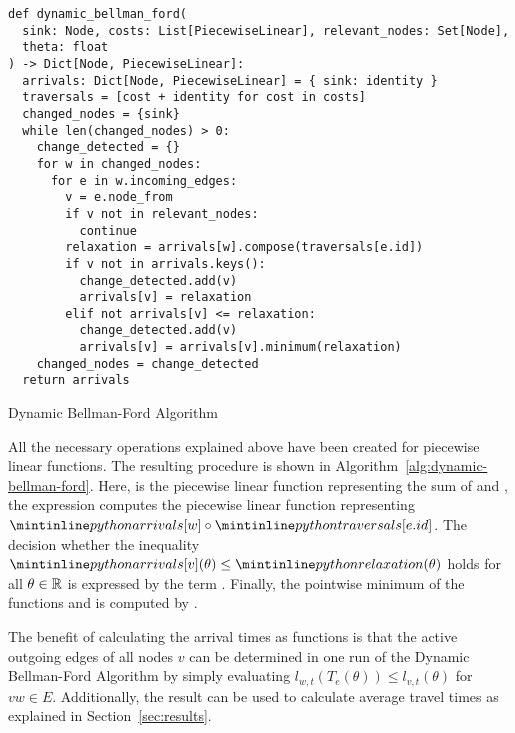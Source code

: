 \begin{algorithm}[ht]
    \begin{verbatim}
def dynamic_bellman_ford(
  sink: Node, costs: List[PiecewiseLinear], relevant_nodes: Set[Node],
  theta: float
) -> Dict[Node, PiecewiseLinear]:
  arrivals: Dict[Node, PiecewiseLinear] = { sink: identity }
  traversals = [cost + identity for cost in costs]
  changed_nodes = {sink}
  while len(changed_nodes) > 0:
    change_detected = {}
    for w in changed_nodes:
      for e in w.incoming_edges:
        v = e.node_from
        if v not in relevant_nodes:
          continue
        relaxation = arrivals[w].compose(traversals[e.id])
        if v not in arrivals.keys():
          change_detected.add(v)
          arrivals[v] = relaxation
        elif not arrivals[v] <= relaxation:
          change_detected.add(v)
          arrivals[v] = arrivals[v].minimum(relaxation)
    changed_nodes = change_detected
  return arrivals
    \end{verbatim}
    \caption{Dynamic Bellman-Ford Algorithm}
    \label{alg:dynamic-bellman-ford}
\end{algorithm}

All the necessary operations explained above have been created for piecewise linear functions.
The resulting procedure is shown in Algorithm~\ref{alg:dynamic-bellman-ford}.
Here,  is the piecewise linear function representing the sum of  and , the expression  computes the piecewise linear function representing $\code{arrivals[w]}\circ \code{traversals[e.id]}$.
The decision whether the inequality $\code{arrivals[v]}(\theta) \leq \code{relaxation}(\theta)$ holds for all $\theta \in \mathbb{R}$ is expressed by the term . 
Finally, the pointwise minimum of the functions  and  is computed by .


The benefit of calculating the arrival times as functions is that the active outgoing edges of all nodes $v$ can be determined in one run of the Dynamic Bellman-Ford Algorithm by simply evaluating $l_{w,t}(T_e(\theta)) \leq  l_{v,t}(\theta)$ for $vw\in E$.
Additionally, the result can be used to calculate average travel times as explained in Section~\ref{sec:results}.